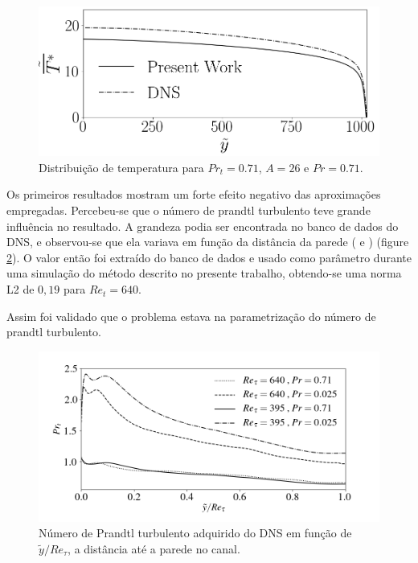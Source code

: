 \begin{figure}[!h]
\begin{minipage}{0.49\textwidth}
  \end{minipage}
  \hfill
  \begin{minipage}{0.49\textwidth}
    \centering
    \includegraphics[angle=0, scale=0.32]{fotos_formatacao_final/Temperature_1000_071_classico}
  \end{minipage}
  \caption{Distribuição de temperatura para $Pr_t = 0.71$, $A = 26$ e $Pr = 0.71$.} 
  \label{figuraresultados1}
\end{figure}

Os primeiros resultados mostram um forte efeito negativo das aproximações empregadas. Percebeu-se que o número de prandtl turbulento teve grande influência no resultado.
A grandeza podia ser encontrada no banco de dados do DNS, e observou-se que ela variava em função da distância da parede (\cite{dns1020} e \cite{dns150}) (figure \ref{figure5}).
O valor então foi extraído do banco de dados e usado como parâmetro durante uma simulação do método descrito no presente trabalho, obtendo-se uma norma L2 de $ 0,19 $ para $ Re_t = 640 $.

Assim foi validado que o problema estava na parametrização do número de prandtl turbulento.

\begin{figure}[h!]
	\centering
	\includegraphics[angle=0, scale=0.62]{fotos_formatacao_final/DNS_PRt}
	\caption{Número de Prandtl turbulento adquirido do DNS em função de $ \tilde{y}/Re_\tau $, a distância até a parede no canal.}
	\label{figure5}
\end{figure}

